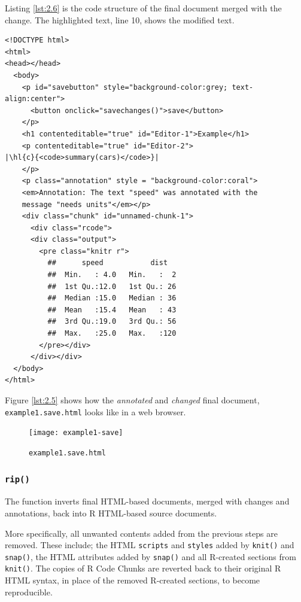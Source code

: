 \documentclass[a4paper, 12pt]{report}
\begin{document}
Listing \ref{lst:2.6} is the code structure of the final document merged with the change. The highlighted text, line 10, shows the modified text.
\begin{lstlisting}[caption={(tidied) \texttt{example1.save.html}}, escapechar=\|, label={lst:2.6}]
<!DOCTYPE html>
<html>
<head></head>
  <body>
    <p id="savebutton" style="background-color:grey; text-align:center">
      <button onclick="savechanges()">save</button>
    </p>
    <h1 contenteditable="true" id="Editor-1">Example</h1>
    <p contenteditable="true" id="Editor-2">
|\hl{c}{<code>summary(cars)</code>}|
    </p>
    <p class="annotation" style = "background-color:coral">
    <em>Annotation: The text "speed" was annotated with the
    message "needs units"</em></p>
    <div class="chunk" id="unnamed-chunk-1">
      <div class="rcode">
      <div class="output">
        <pre class="knitr r">
          ##      speed           dist    
          ##  Min.   : 4.0   Min.   :  2  
          ##  1st Qu.:12.0   1st Qu.: 26  
          ##  Median :15.0   Median : 36  
          ##  Mean   :15.4   Mean   : 43  
          ##  3rd Qu.:19.0   3rd Qu.: 56  
          ##  Max.   :25.0   Max.   :120
        </pre></div>
      </div></div>
  </body>
</html>
\end{lstlisting}

Figure \ref{lst:2.5} shows how the \emph{annotated} and \emph{changed} final document, \texttt{example1.save.html} looks like in a web browser.
\begin{figure}[h]
\texttt{[image: example1-save]}
\caption{\texttt{example1.save.html}}
\label{fig:2.5}
\end{figure}


\subsubsection*{\texttt{rip()}}
The function inverts final HTML-based documents, merged with changes and annotations, back into R HTML-based source documents.

More specifically, all unwanted contents added from the previous steps are removed. These include; the HTML \texttt{scripts} and \texttt{styles} added by \texttt{knit()} and \texttt{snap()}, the HTML attributes added by \texttt{snap()} and all R-created sections from \texttt{knit()}. The copies of R Code Chunks are reverted back to their original R HTML syntax, in place of the removed R-created sections, to become reproducible.
\end{document}
